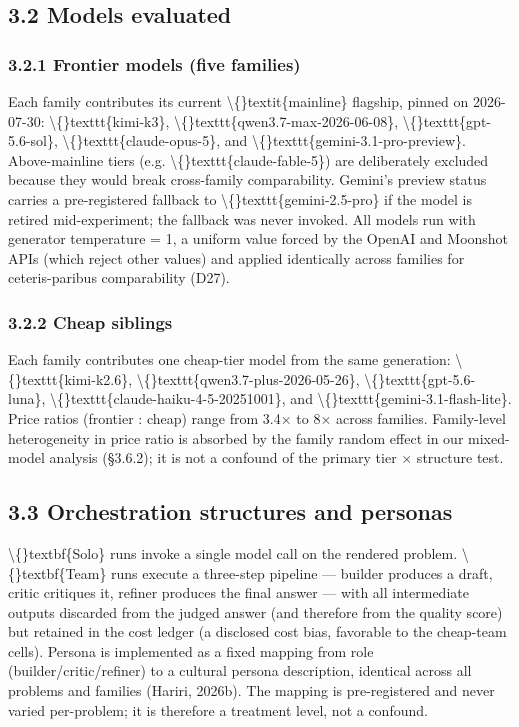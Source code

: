 \documentclass[11pt,a4paper]{article}
\begin{document}
\subsection{3.2 Models evaluated}

\subsubsection{3.2.1 Frontier models (five families)}

Each family contributes its current \textbackslash\{\}textit\{mainline\} flagship, pinned on
2026-07-30: \textbackslash\{\}texttt\{kimi-k3\}, \textbackslash\{\}texttt\{qwen3.7-max-2026-06-08\}, \textbackslash\{\}texttt\{gpt-5.6-sol\},
\textbackslash\{\}texttt\{claude-opus-5\}, and \textbackslash\{\}texttt\{gemini-3.1-pro-preview\}. Above-mainline tiers
(e.g. \textbackslash\{\}texttt\{claude-fable-5\}) are deliberately excluded because they would
break cross-family comparability. Gemini's preview status carries a
pre-registered fallback to \textbackslash\{\}texttt\{gemini-2.5-pro\} if the model is retired
mid-experiment; the fallback was never invoked. All models run with
generator temperature = 1, a uniform value forced by the OpenAI and
Moonshot APIs (which reject other values) and applied identically
across families for ceteris-paribus comparability (D27).

\subsubsection{3.2.2 Cheap siblings}

Each family contributes one cheap-tier model from the same generation:
\textbackslash\{\}texttt\{kimi-k2.6\}, \textbackslash\{\}texttt\{qwen3.7-plus-2026-05-26\}, \textbackslash\{\}texttt\{gpt-5.6-luna\},
\textbackslash\{\}texttt\{claude-haiku-4-5-20251001\}, and \textbackslash\{\}texttt\{gemini-3.1-flash-lite\}. Price ratios
(frontier : cheap) range from 3.4× to 8× across families. Family-level
heterogeneity in price ratio is absorbed by the family random effect
in our mixed-model analysis (§3.6.2); it is not a confound of the
primary tier × structure test.

\subsection{3.3 Orchestration structures and personas}

\textbackslash\{\}textbf\{Solo\} runs invoke a single model call on the rendered problem.
\textbackslash\{\}textbf\{Team\} runs execute a three-step pipeline — builder produces a draft,
critic critiques it, refiner produces the final answer — with all
intermediate outputs discarded from the judged answer (and therefore
from the quality score) but retained in the cost ledger (a disclosed
cost bias, favorable to the cheap-team cells). Persona is implemented
as a fixed mapping from role (builder/critic/refiner) to a cultural
persona description, identical across all problems and families
(Hariri, 2026b). The mapping is pre-registered and never varied
per-problem; it is therefore a treatment level, not a confound.
\end{document}
